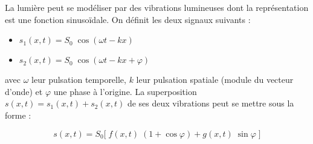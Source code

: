 







\hauteurLargeurCadreReponse		{8mm}{2.75cm}
\initialisationEntrainement

La lumière peut se modéliser par des vibrations lumineuses dont la représentation est une fonction sinusoïdale. On définit les deux signaux suivants :

\begin{itemize}
	\item $s_1 \left( x,t \right)=S_0 \; \cos \left( \omega t - k x\right)$
	\item $s_2 \left(x,t\right)=S_0 \; \cos \left( \omega t - k x + \varphi\right)$
\end{itemize}

\noindent
avec $\omega$ leur pulsation temporelle, $k$ leur pulsation spatiale (module du vecteur d'onde) et $\varphi$ une phase à l'origine. La superposition $s \left(x,t\right)=s_1 \left(x,t\right) + s_2 \left(x,t\right)$ de ses deux vibrations peut se mettre sous la forme :

\begin{equation*}
	s \left(x,t\right) = S_0 \big[ \; f\left(x,t\right)\; \left( 1+\cos \varphi \right) + g\left(x,t\right) \; \sin \varphi \; \big]
\end{equation*}

\debutEntrainement


